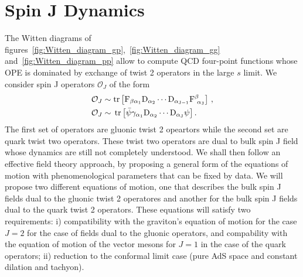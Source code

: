 \documentclass[a4paper,12pt]{article}
\begin{document}
\section{Spin J Dynamics}

The Witten diagrams of figures~\ref{fig:Witten_diagram_gp},~\ref{fig:Witten_diagram_gg} and~\ref{fig:Witten_diagram_pp} allow to compute QCD four-point functions whose OPE is dominated by exchange of twist 2 operators in the large $s$ limit. We consider spin J operators $\mathcal{O}_J$ of the form
\begin{align}
&\mathcal{O}_J \sim \rm{tr} \left[ F_{\beta \alpha_1} D_{\alpha_2} \cdots D_{\alpha_{J - 1}} F^{\beta}_{\, \, \alpha_J} \right] \, , \\
&\mathcal{O}_J \sim \, \rm{tr} \left[ \bar{\psi} \gamma_{\alpha_1} D_{\alpha_2} \cdots D_{\alpha_J} \psi \right] . \notag
\end{align}
The first set of operators are gluonic twist 2 opeartors while the second set are quark twist two operators.
These twist two operators are dual to bulk spin J field whose dynamics are still not completely understood. We shall then follow an effective field theory approach, by proposing a general form of the equations of motion with phenomenological parameters that can be fixed by data. We will propose two different equations of motion, one that describes the bulk spin J fields dual to the gluonic twist 2 operatores and another for the bulk spin J fields dual to the  quark twist 2 operators. These equations will satisfy two requirements: i) compatibility with the graviton's equation of motion for the case $J = 2$ for the case of fields dual to the gluonic operators, and compability with the equation of motion of the vector mesons for $J = 1$ in the case of the quark operators; ii) reduction to the conformal limit case (pure AdS space and constant dilation and tachyon).
\end{document}
